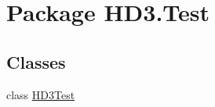 \hypertarget{namespace_h_d3_1_1_test}{\section{Package H\+D3.\+Test}
\label{namespace_h_d3_1_1_test}
}
\subsection*{Classes}
\begin{DoxyCompactItemize}
\item 
class \hyperlink{class_h_d3_1_1_test_1_1_h_d3_test}{H\+D3\+Test}
\end{DoxyCompactItemize}
